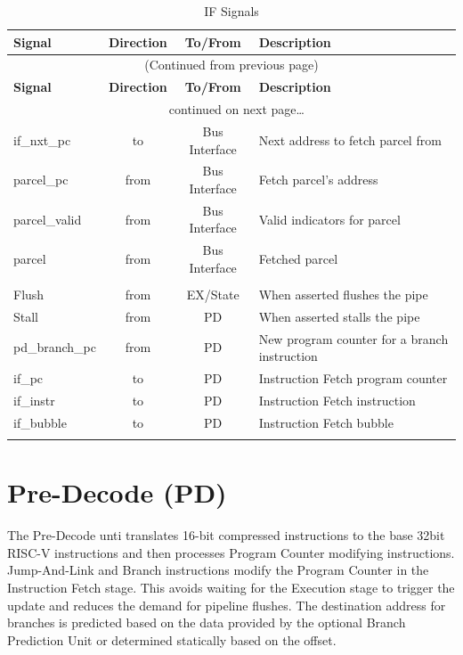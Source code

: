 \begin{longtable}[]{@{}lccl@{}}
	\toprule
	\textbf{Signal} & \textbf{Direction} & \textbf{To/From} & \textbf{Description}\tabularnewline
	\midrule
	\endfirsthead
	\multicolumn{4}{c}{{(Continued from previous page)}} \\
	\toprule
	\textbf{Signal} & \textbf{Direction} & \textbf{To/From} & \textbf{Description}\tabularnewline
	\midrule
	\endhead
	\midrule \multicolumn{4}{c}{{\tablename\ \thetable{} continued on next page\ldots}} \\
	\endfoot
	\endlastfoot

	if\_nxt\_pc &	to	& Bus Interface	& Next address to fetch parcel from\\
	parcel\_pc &	from &	Bus Interface &	Fetch parcel's address\\
	parcel\_valid &	from &	Bus Interface &	Valid indicators for parcel\\
	parcel	& from &	Bus Interface &	Fetched parcel\\
	\\		
	Flush &	from &	EX/State &	When asserted flushes the pipe\\
	Stall &	from &	PD &	When asserted stalls the pipe\\
	pd\_branch\_pc &	from &	PD	& New program counter for a branch instruction\\
	if\_pc &	to & PD	 & Instruction Fetch program counter\\
	if\_instr &	to	& PD &	Instruction Fetch instruction\\
	if\_bubble &	to & PD	& Instruction Fetch bubble\\
		
	\bottomrule
\caption{IF Signals}
\label{tab:if-signals}
\end{longtable}

\pagebreak

\section{Pre-Decode (PD)}\label{pre-decode-pd}

The Pre-Decode unti translates 16-bit compressed instructions to the base 32bit RISC-V instructions and then processes Program Counter modifying instructions. Jump-And-Link and Branch instructions modify the Program Counter in the Instruction Fetch stage. This avoids waiting for the Execution stage to trigger the update and reduces the demand for pipeline flushes.
The destination address for branches is predicted based on the data provided by the optional Branch Prediction Unit or determined statically based on the offset.


